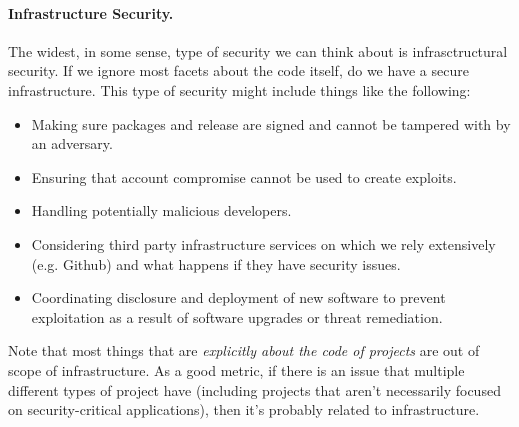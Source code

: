 \paragraph{Infrastructure Security.}  The widest, in some sense, type of security we can think about is infrasctructural security.  If we ignore most facets about the code itself, do we have a secure infrastructure.  This type of security might include things like the following:
\begin{itemize}
\item Making sure packages and release are signed and cannot be tampered with by an adversary.
\item Ensuring that account compromise cannot be used to create exploits.
\item Handling potentially malicious developers.
\item Considering third party infrastructure services on which we rely extensively (e.g. Github) and what happens if they have security issues.
\item Coordinating disclosure and deployment of new software to prevent exploitation as a result of software upgrades or threat remediation.
\end{itemize}
Note that most things that are \emph{explicitly about the code of projects} are out of scope of infrastructure.  As a good metric, if there is an issue that multiple different types of project have (including projects that aren't necessarily focused on security-critical applications), then it's probably related to infrastructure.

